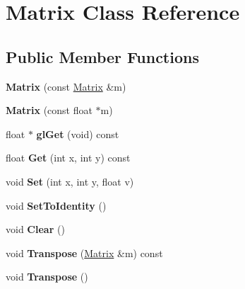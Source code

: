 \hypertarget{classMatrix}{\section{\-Matrix \-Class \-Reference}
\label{classMatrix}
}
\subsection*{\-Public \-Member \-Functions}
\begin{DoxyCompactItemize}
\item 
\hypertarget{classMatrix_a765f4dcb51b6829311cc3e7576388423}{{\bfseries \-Matrix} (const \hyperlink{classMatrix}{\-Matrix} \&m)}\label{classMatrix_a765f4dcb51b6829311cc3e7576388423}

\item 
\hypertarget{classMatrix_acfc1445f8a381d32f1989cd35714c290}{{\bfseries \-Matrix} (const float $\ast$m)}\label{classMatrix_acfc1445f8a381d32f1989cd35714c290}

\item 
\hypertarget{classMatrix_af8d06eec2ed4cc9329d664d539c7f2b8}{float $\ast$ {\bfseries gl\-Get} (void) const }\label{classMatrix_af8d06eec2ed4cc9329d664d539c7f2b8}

\item 
\hypertarget{classMatrix_aef91dcc82ede72fd100dc3e4004234c7}{float {\bfseries \-Get} (int x, int y) const }\label{classMatrix_aef91dcc82ede72fd100dc3e4004234c7}

\item 
\hypertarget{classMatrix_ac3560c1c5173148d2ed77488e46bd79f}{void {\bfseries \-Set} (int x, int y, float v)}\label{classMatrix_ac3560c1c5173148d2ed77488e46bd79f}

\item 
\hypertarget{classMatrix_a16343771112fd6a54e6f3383bd82598d}{void {\bfseries \-Set\-To\-Identity} ()}\label{classMatrix_a16343771112fd6a54e6f3383bd82598d}

\item 
\hypertarget{classMatrix_a77024c11b6ff4b02a265bfda0ff7eab1}{void {\bfseries \-Clear} ()}\label{classMatrix_a77024c11b6ff4b02a265bfda0ff7eab1}

\item 
\hypertarget{classMatrix_a8191ef7491d6caa30bc367ec7c64cf30}{void {\bfseries \-Transpose} (\hyperlink{classMatrix}{\-Matrix} \&m) const }\label{classMatrix_a8191ef7491d6caa30bc367ec7c64cf30}

\item 
\hypertarget{classMatrix_a350d12361c31ec650e667e8120da7274}{void {\bfseries \-Transpose} ()}\label{classMatrix_a350d12361c31ec650e667e8120da7274}


\end{DoxyCompactItemize}
